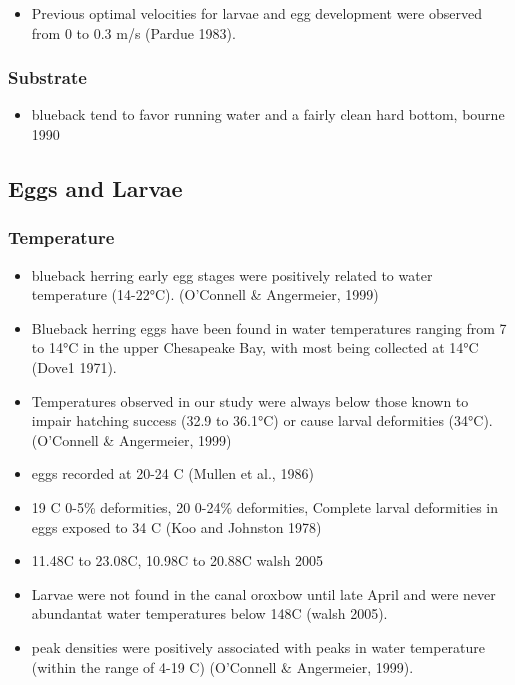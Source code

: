 \documentclass[
]{book}
\providecommand{\tightlist}{%
  \setlength{\itemsep}{0pt}\setlength{\parskip}{0pt}}
\begin{document}
\begin{itemize}
\tightlist
\item
  Previous optimal velocities for larvae and egg development were observed from 0 to 0.3 m/s (Pardue 1983).
\end{itemize}

\hypertarget{substrate-4}{%
\subsubsection{Substrate}\label{substrate-4}}

\begin{itemize}
\tightlist
\item
  blueback tend to favor running water and a fairly clean hard bottom, bourne 1990
\end{itemize}

\hypertarget{eggs-and-larvae}{%
\subsection{Eggs and Larvae}\label{eggs-and-larvae}}

\hypertarget{temperature-5}{%
\subsubsection{Temperature}\label{temperature-5}}

\begin{itemize}
\tightlist
\item
  blueback herring early egg stages were positively related to water temperature (14-22°C). (O'Connell \& Angermeier, 1999)
\item
  Blueback herring eggs have been found in water temperatures ranging from 7 to 14°C in the upper Chesapeake Bay, with most being collected at 14°C (Dove1 1971).
\item
  Temperatures observed in our study were always below those known to impair hatching success (32.9 to 36.1°C) or cause larval deformities (34°C). (O'Connell \& Angermeier, 1999)
\item
  eggs recorded at 20-24 C (Mullen et al., 1986)
\item
  19 C 0-5\% deformities, 20 0-24\% deformities, Complete larval deformities in eggs exposed to 34 C (Koo and Johnston 1978)
\item
  11.48C to 23.08C, 10.98C to 20.88C walsh 2005
\item
  Larvae were not found in the canal oroxbow until late April and were never abundantat water temperatures below 148C (walsh 2005).
\item
  peak densities were positively associated with peaks in water temperature (within the range of 4-19 C) (O'Connell \& Angermeier, 1999).
\end{itemize}
\end{document}
